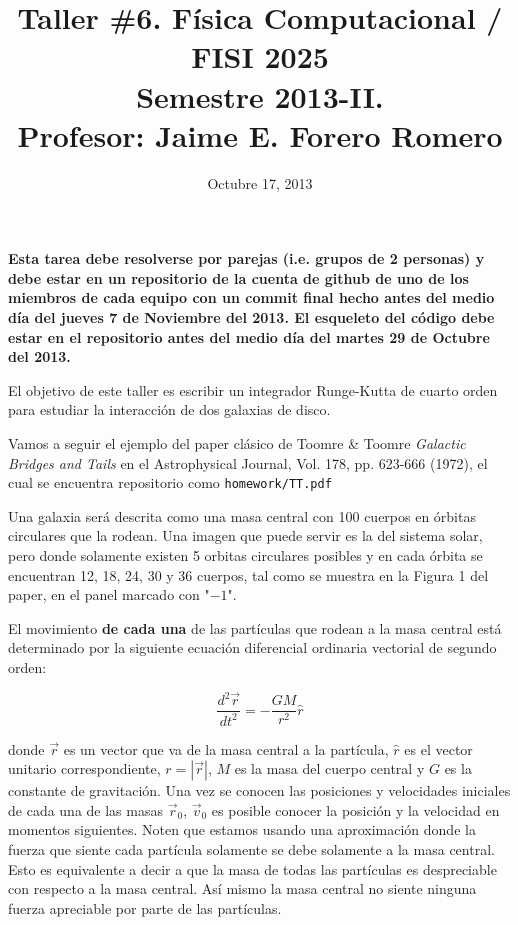 \documentclass{article}
\title{Taller \#6. F\'isica Computacional / FISI 2025 \\Semestre
  2013-II. \\ Profesor: Jaime E. Forero Romero}
\date{Octubre 17, 2013}
\begin{document}
\maketitle

{\bf Esta tarea debe resolverse por parejas (i.e. grupos de 2
  personas) y debe estar en un repositorio de la cuenta de github de
  uno de los miembros de cada equipo con un commit final hecho antes del
  medio d\'ia del jueves 7 de Noviembre del 2013. El esqueleto del
  c\'odigo debe estar en el repositorio antes del medio d\'ia del
  martes 29 de Octubre del 2013.}   


El objetivo de este taller es escribir un integrador Runge-Kutta de
cuarto orden para estudiar la interacci\'on de dos galaxias de
disco. 

Vamos a seguir el ejemplo  del paper cl\'asico de Toomre \& Toomre
\textit{Galactic Bridges and Tails} en el Astrophysical Journal, Vol. 178,
pp. 623-666 (1972), el cual se encuentra repositorio como
\verb"homework/TT.pdf" 

Una galaxia ser\'a descrita como una masa central con 100
cuerpos en \'orbitas circulares que la rodean. Una imagen que puede
servir es la del sistema solar, pero donde solamente existen 5 orbitas
circulares posibles y en cada \'orbita se encuentran 12, 18, 24, 30 y 36
cuerpos, tal como se muestra en la Figura 1 del paper, en el panel
marcado con "$-1$". 

El movimiento {\bf de cada una} de las part\'iculas que rodean a la masa
central est\'a determinado por la siguiente ecuaci\'on diferencial
ordinaria vectorial de segundo orden: 
 
\begin{equation}
\frac{d^2\vec{r}}{dt^2} = -\frac{GM}{r^2} \hat{r}
\end{equation}

donde $\vec{r}$  es un vector que va de la masa central a la
part\'icula, $\hat{r}$ es el vector unitario correspondiente,
$r=|\vec{r}|$, $M$ es la masa del cuerpo central y $G$ es la constante
de gravitaci\'on.  Una vez se conocen las posiciones y velocidades
iniciales de cada una de las masas $\vec{r}_0$, $\vec{v}_0$ es posible
conocer la posici\'on y la velocidad en momentos siguientes. Noten que
estamos usando una  aproximaci\'on donde la fuerza que siente cada
part\'icula solamente se debe solamente a la masa central. Esto es
equivalente a decir a  que la masa de todas las part\'iculas es
despreciable con respecto a la masa central. As\'i mismo la masa central no siente ninguna  fuerza apreciable por parte de las part\'iculas.
\end{document}
